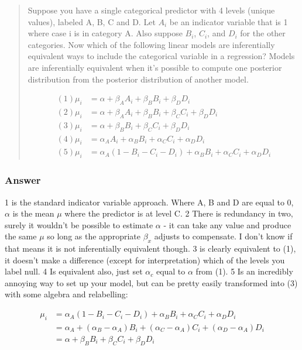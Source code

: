 \documentclass[
]{book}
\begin{document}
\begin{quote}
Suppose you have a single categorical predictor with 4 levels (unique values), labeled A, B, C and D. Let \(A_i\) be an indicator variable that is 1 where case i is in category A. Also suppose \(B_i\), \(C_i\), and \(D_i\) for the other categories.
Now which of the following linear models are inferentially equivalent ways to include the categorical variable in a regression? Models are inferentially equivalent when it's possible to compute one posterior distribution from the posterior distribution of another model.

\[
\begin{aligned}
(1) \mu_i &= \alpha + \beta_A A_i + \beta_B B_i + \beta_D D_i  \\
(2) \mu_i &= \alpha + \beta_A A_i + \beta_B B_i + \beta_C C_i + \beta_D D_i \\ 
(3) \mu_i &= \alpha + \beta_B B_i + \beta_C C_i + \beta_D D_i \\
(4) \mu_i &= \alpha_A A_i + α_B B_i + α_C C_i + α_D D_i \\
(5) \mu_i &= \alpha_A(1 − B_i − C_i −D_i) + \alpha_B B_i + \alpha_C C_i + \alpha_D D_i
\end{aligned}
\]
\end{quote}

\hypertarget{answer-48}{%
\subsubsection*{Answer}\label{answer-48}}

1 is the standard indicator variable approach. Where A, B and D are equal to 0, \(\alpha\) is the mean \(\mu\) where the predictor is at level C.
2 There is redundancy in two, surely it wouldn't be possible to estimate \(\alpha\) - it can take any value and produce the same \(\mu\) so long as the appropriate \(\beta_x\) adjusts to compensate. I don't know if that means it is not inferentially equivalent though.
3 is clearly equivalent to (1), it doesn't make a difference (except for interpretation) which of the levels you label null.
4 Is equivalent also, just set \(\alpha_c\) equal to \(\alpha\) from (1).
5 Is an incredibly annoying way to set up your model, but can be pretty easily transformed into (3) with some algebra and relabelling:

\[
\begin{aligned}
\mu_i &= \alpha_A(1 − B_i − C_i −D_i) + \alpha_B B_i + \alpha_C C_i + \alpha_D D_i \\
&= \alpha_A + (\alpha_B-\alpha_A)B_i + (\alpha_C -\alpha_A)C_i +(\alpha_D-\alpha_A)D_i  \\
&= \alpha + \beta_B B_i + \beta_C C_i + \beta_D D_i
\end{aligned}          
\]
\end{document}
